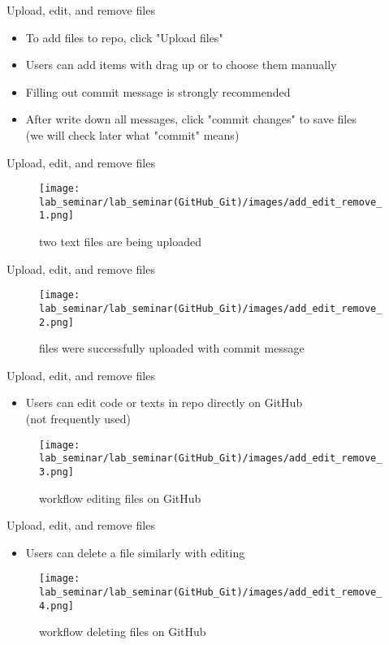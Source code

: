 \documentclass[11pt, xelatex]{beamer}
\newcommand{\bi}{\begin{itemize}}
\newcommand{\ei}{\end{itemize}}
\begin{document}
\begin{frame}{Upload, edit, and remove files}
\bi
\item To add files to repo, click "Upload files" 
\item Users can add items with drag up or to choose them manually
\item Filling out commit message is strongly recommended
\item After write down all messages, click "commit changes" to save files\\
(we will check later what "commit" means)
\ei
\end{frame}

\begin{frame}{Upload, edit, and remove files}
\begin{figure}
	\texttt{[image: lab\_seminar/lab\_seminar(GitHub\_Git)/images/add\_edit\_remove\_1.png]}
	\caption{two text files are being uploaded}
\end{figure}
\end{frame}

\begin{frame}{Upload, edit, and remove files}
\begin{figure}
	\texttt{[image: lab\_seminar/lab\_seminar(GitHub\_Git)/images/add\_edit\_remove\_2.png]}
	\caption{files were successfully uploaded with commit message}
\end{figure}
\end{frame}

\begin{frame}{Upload, edit, and remove files}
\bi
\item Users can edit code or texts in repo directly on GitHub\\(not frequently used)
\ei
\begin{figure}
	\texttt{[image: lab\_seminar/lab\_seminar(GitHub\_Git)/images/add\_edit\_remove\_3.png]}
	\caption{workflow editing files on GitHub}
\end{figure}
\end{frame}

\begin{frame}{Upload, edit, and remove files}
\bi
\item Users can delete a file similarly with editing
\ei
\begin{figure}
	\texttt{[image: lab\_seminar/lab\_seminar(GitHub\_Git)/images/add\_edit\_remove\_4.png]}
	\caption{workflow deleting files on GitHub}
\end{figure}
\end{frame}
\end{document}

